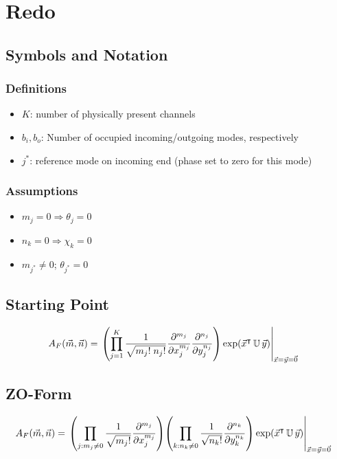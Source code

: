 \documentclass[
	english,
	a4paper,
	fontsize=10pt,
	parskip=half,
	titlepage=true,
	DIV=12,
	final
]{scrreprt}
\title{\myTitle}
\author{\myName}
\date{\today}
\newcommand*{\Thus}{\ensuremath{\Rightarrow}\xspace}
\newcommand*{\transp}{\ensuremath{^\intercal}}
\begin{document}
\tableofcontents
\newpage

\chapter{Redo}
\section{Symbols and Notation}
\subsection{Definitions}
\begin{itemize}
\item $K$: number of physically present channels
\item $b_i, b_o$: Number of occupied incoming/outgoing modes, respectively
\item $j^*$: reference mode on incoming end (phase set to zero for this mode)
\end{itemize}

\subsection{Assumptions}
\begin{itemize}
\item $m_j = 0 \Thus \theta_j = 0$
\item $n_k = 0 \Thus \chi  _k = 0$
\item $m_{j^*} \neq 0$; $\theta_{j^*} = 0$
\end{itemize}


\section{Starting Point}
\begin{align}
	A_F(\vec{m}, \vec{n})
&=
	\eval{\qty(
			\prod_{j=1}^{K}
			\frac
				{1}
				{\sqrt{m_j! \; n_j!}}
			\pdv[m_j]{x_j}
			\pdv[n_j]{y_j}
		) \exp(\vec{x}\transp \, \mathbb{U} \, \vec{y})
	}_{\vec{x} = \vec{y} = \vec{0}}
\label{eqn:BSA_raw}
\end{align}

\section{ZO-Form}
\begin{align}
	A_F(\vec{m}, \vec{n})
&=
	\eval{
		\qty(
			\prod_{j : m_j \neq 0}
			\frac {1} {\sqrt{m_j!}}
			\pdv[m_j]{x_j}
		)
		\qty(
			\prod_{k : n_k \neq 0}
			\frac
				{1}
				{\sqrt{n_k!}}
			\pdv[n_k]{y_k}
		)
		\exp(\vec{x}\transp \, \mathbb{U} \, \vec{y})
	}_{\vec{x} = \vec{y} = \vec{0}}
\label{eqn:BSA_ZO}
\end{align}
\end{document}

